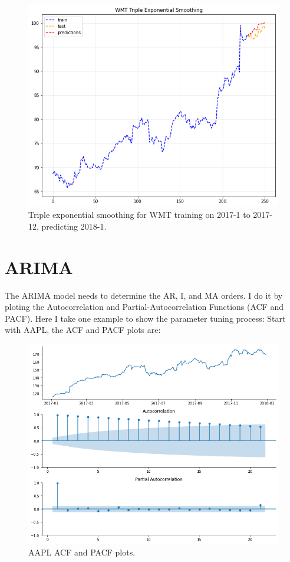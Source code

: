 \documentclass[11pt]{article}
\begin{document}
\begin{figure}[h!]
\centerline{\includegraphics[scale=0.5]{tes_3.png}}
\caption{Triple exponential smoothing for WMT training on 2017-1 to 2017-12, predicting 2018-1.}
\end{figure}

\newpage

\section{ARIMA}\label{section-arima}
The ARIMA model needs to determine the AR, I, and MA orders. I do it by ploting the Autocorrelation and Partial-Autocorrelation Functions (ACF and PACF).
Here I take one example to show the parameter tuning process:
Start with AAPL, the ACF and PACF plots are:

\begin{figure}[h!]
\centerline{\includegraphics[scale=0.5]{arima1.png}}
\caption{AAPL ACF and PACF plots.}
\end{figure}
\end{document}
